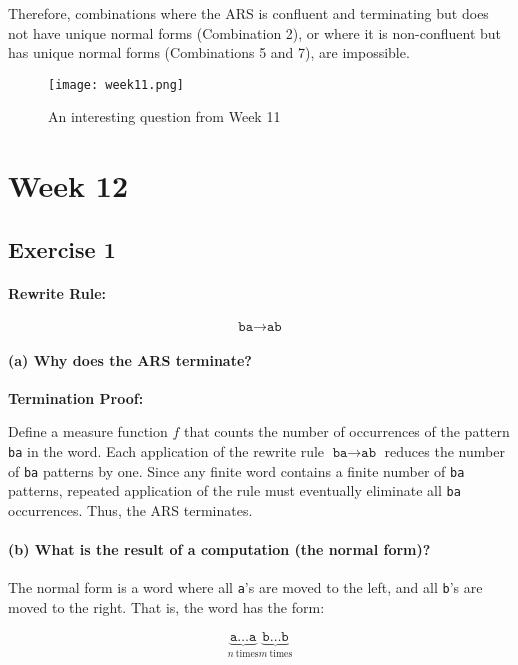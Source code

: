 \documentclass{article}
\theoremstyle{theorem}
\theoremstyle{definition}
\theoremstyle{remark}
\begin{document}
Therefore, combinations where the ARS is confluent and terminating but does not have unique normal forms (Combination 2), or where it is non-confluent but has unique normal forms (Combinations 5 and 7), are impossible.

\begin{figure}[h]
    \centering
    \texttt{[image: week11.png]} %
    \caption{An interesting question from Week 11}
    \label{fig:week11_question}
\end{figure}

\section*{Week 12}

\subsection*{Exercise 1}

\paragraph{Rewrite Rule:}

\[
\texttt{ba} \to \texttt{ab}
\]

\paragraph{(a) Why does the ARS terminate?}

\textbf{Termination Proof:}

Define a measure function \( f \) that counts the number of occurrences of the pattern \texttt{ba} in the word. Each application of the rewrite rule \(\texttt{ba} \to \texttt{ab}\) reduces the number of \texttt{ba} patterns by one. Since any finite word contains a finite number of \texttt{ba} patterns, repeated application of the rule must eventually eliminate all \texttt{ba} occurrences. Thus, the ARS terminates.

\paragraph{(b) What is the result of a computation (the normal form)?}

The normal form is a word where all \texttt{a}'s are moved to the left, and all \texttt{b}'s are moved to the right. That is, the word has the form:

\[
\underbrace{\texttt{a}\ldots\texttt{a}}_{n\ \text{times}} \underbrace{\texttt{b}\ldots\texttt{b}}_{m\ \text{times}}
\]
\end{document}
